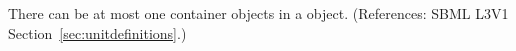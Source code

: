There can be at most one \ListOfUnits container objects in a
\UnitDefinition object.  (References: SBML L3V1
Section~\ref{sec:unitdefinitions}.)
